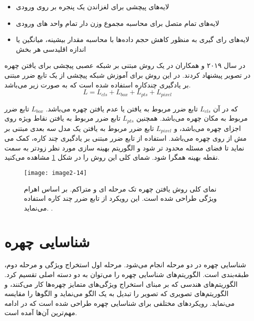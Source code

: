 \begin{itemize}
\setlength\itemsep{0.5em}
\item
لایه‌های پیچشی  برای لغزاندن یک پنجره بر روی ورودی
\item
لایه‌های تمام متصل   برای محاسبه مجموع وزن دار تمام واحد های ورودی
\item
لایه‌های رای گیری  به منظور کاهش حجم داده‌ها با محاسبه مقدار بیشینه، میانگین یا اندازه اقلیدسی هر بخش
\end{itemize}

\noindent
در سال ۲۰۱۹  و همکاران در \cite{deng2019retinaface} یک روش مبتنی بر شبکه عصبی پیچشی برای یافتن چهره در تصویر پیشنهاد کردند.‌ در این روش برای آموزش شبکه پیچشی از یک تابع ضرر مبتنی بر یادگیری چندکاره  استفاده شده است که به صورت زیر می‌باشد.
\begin{equation}\label{eq3-2}
L = L_{cls} + L_{box} + L_{pts} + L_{pixel}  
\end{equation}

\noindent
که در آن $L_{cls}$ تابع ضرر مربوط به یافتن یا عدم یافتن چهره می‌باشد. $L_{box}$ تابع ضرر مربوط به مکان چهره می‌باشد. همچنین $L_{pts}$ تابع ضرر مربوط به یافتن نقاط ویژه روی اجزای چهره می‌باشد، و $L_{pixel}$ تابع ضرر مربوط به یافتن یک مدل سه بعدی مبتنی بر مش از روی چهره می‌باشد. استفاده از تابع ضرر مبتنی بر یادگیری چند کاره، کمک می نماید تا فضای مسئله محدود تر شود و الگوریتم بهینه سازی مورد نظر زودتر به سمت نقطه بهینه همگرا شود. شمای کلی این روش را در شکل \ref{image2-14} مشاهده می‌کنید. 

\begin{figure}[h]
\centering
  \texttt{[image: image2-14]}
  \caption{
نمای کلی روش یافتن چهره تک مرحله ای و متراکم.   بر اساس اهرام ویژگی طراحی شده است. این رویکرد از تابع ضرر چند کاره استفاده می‌نماید.
 \cite{deng2019retinaface}.}
  \label{image2-14}
\end{figure}

\section{شناسایی چهره}
شناسایی چهره در دو مرحله انجام می‌شود. مرحله اول استخراج ویژگی و مرحله دوم، طبقه‌بندی است. الگوریتم‌های شناسایی چهره را می‌توان به دو دسته اصلی تقسیم کرد. الگوریتم‌های هندسی که بر مبنای استخراج ویژگی‌های متمایز چهره‌ها کار می‌کنند، و الگوریتم‌های تصویری که تصویر را تبدیل به یک الگو می‌نماید و الگوها را مقایسه می‌نماید. رویکردهای مختلفی برای شناسایی چهره طراحی شده است که در ادامه مهم‌ترین آن‌ها آمده است.

